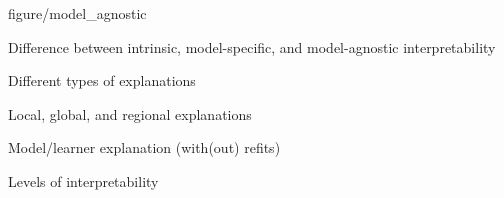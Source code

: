 \documentclass[10pt,compress,t,notes=noshow, xcolor=table]{beamer}
\date{}
\begin{document}
{
figure/model_agnostic
}{
\item Difference between intrinsic, model-specific, and model-agnostic interpretability
\item Different types of explanations
\item Local, global, and regional explanations
\item Model/learner explanation (with(out) refits)
\item Levels of interpretability 
}
\end{document}
